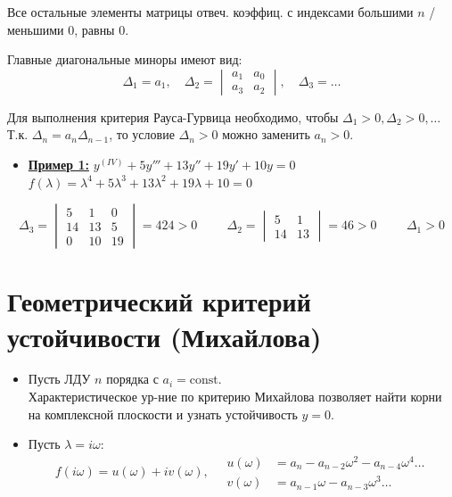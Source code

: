 Все остальные элементы матрицы отвеч. коэффиц. с индексами большими $n$ / меньшими $0$, равны $0$.

Главные диагональные миноры имеют вид: 
\begin{equation*}
	\Delta_1 = a_1, \quad \Delta_2 = \begin{vmatrix} a_1 & a_0 \\ a_3 & a_2 \end{vmatrix}, \quad \Delta_3 = \dots
\end{equation*}

Для выполнения критерия Рауса-Гурвица необходимо, чтобы $\Delta_1 > 0, \Delta_2 > 0, \dots$ \\
Т.к. $\Delta_n = a_n \Delta_{n-1}$, то условие $\Delta_n > 0$ можно заменить $a_n > 0$.

\begin{itemize}
	\item \underline{\textbf{Пример 1:}} $y^{(IV)} + 5y''' + 13y'' + 19y' + 10y = 0$ \\
	$f(\lambda) = \lambda^4 + 5\lambda^3 + 13\lambda^2 + 19\lambda + 10 = 0$
\end{itemize}

\begin{equation*}
	\Delta_3 = \begin{vmatrix} 5 & 1 & 0 \\ 14 & 13 & 5 \\ 0 & 10 & 19 \end{vmatrix} = 424 > 0 \hspace{1cm}
	\Delta_2 = \begin{vmatrix} 5 & 1 \\ 14 & 13 \end{vmatrix} = 46 > 0 \hspace{1cm}
	\Delta_1 > 0
\end{equation*}

\section{Геометрический критерий устойчивости (Михайлова)}

\begin{itemize}
	\item Пусть ЛДУ $n$ порядка с $a_i = \text{const}$. \\
	Характеристическое ур-ние по критерию Михайлова позволяет найти корни на комплексной плоскости и узнать устойчивость $y=0$.
	\item Пусть $\lambda = i\omega$: 
	\begin{equation*}
		f(i\omega) = u(\omega) + i v(\omega), \quad \begin{aligned}
			u(\omega) &= a_n - a_{n-2}\omega^2 - a_{n-4}\omega^4 \dots \\
			v(\omega) &= a_{n-1}\omega - a_{n-3}\omega^3 \dots
		\end{aligned}
	\end{equation*}
\end{itemize}

